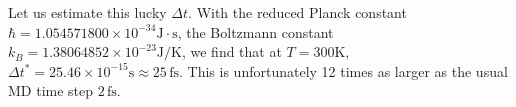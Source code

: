 \documentclass{article}
\begin{document}
Let us estimate this lucky $\Delta t$.
%
With
the reduced Planck constant
$\hbar = 1.054571800\times10^{-34} \mathrm{J}\cdot \mathrm{s}$,
the Boltzmann constant
$k_B = 1.38064852 \times 10^{-23}\mathrm{J}/\mathrm{K}$,
we find that at $T = 300 \mathrm{K}$,
$
\Delta t^* = 25.46 \times 10^{-15}\mathrm{s} \approx 25 \, \mathrm{fs}.
$
This is unfortunately 12 times as larger as the usual
MD time step $2 \, \mathrm{fs}$.
\end{document}
